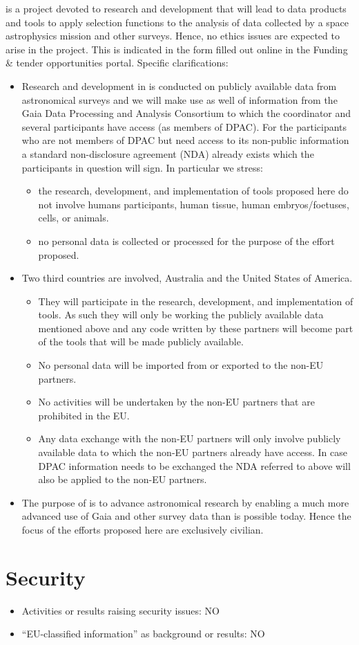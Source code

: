 {\acro} is a project devoted to research and development that will lead to data products and tools to apply selection functions to the analysis of data collected by a space astrophysics mission and other surveys. Hence, no ethics issues are expected to arise in the project. This is indicated in the form filled out online in the Funding \& tender opportunities portal. Specific clarifications:
\begin{itemize}
    \item Research and development in {\acro} is conducted on publicly available data from astronomical surveys and we will make use as well of information from the Gaia Data Processing and Analysis Consortium to which the coordinator and several participants have access (as members of DPAC). For the participants who are not members of DPAC but need access to its non-public information a standard non-disclosure agreement (NDA) already exists which the participants in question will sign. In particular we stress:
    \begin{itemize}
        \item the research, development, and implementation of tools proposed here do not involve humans participants, human tissue, human embryos/foetuses, cells, or animals.
        \item no personal data is collected or processed for the purpose of the effort proposed.
    \end{itemize}
    \item Two third countries are involved, Australia and the United States of America.
    \begin{itemize}
        \item They will participate in the {\acro} research, development, and implementation of tools. As such they will only be working the publicly available data mentioned above and any code written by these partners will become part of the {\acro} tools that will be made publicly available.
        \item No personal data will be imported from or exported to the non-EU partners.
        \item No activities will be undertaken by the non-EU partners that are prohibited in the EU.
        \item Any data exchange with the non-EU partners will only involve publicly available data to which the non-EU partners already have access. In case DPAC information needs to be exchanged the NDA referred to above will also be applied to the non-EU partners.
    \end{itemize}
    \item The purpose of {\acro} is to advance astronomical research by enabling a much more advanced use of Gaia and other survey data than is possible today. Hence the focus of the efforts proposed here are exclusively civilian.
\end{itemize}

\section{Security}
\label{sec:security}
\begin{itemize}
\item Activities or results raising security issues: NO
\item ``EU-classified information'' as background or results: NO
\end{itemize}

